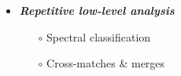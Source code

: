 \begin{frame}
\begin{columns}[T]
\begin{column}{.6\textwidth}
\begin{overlayarea}{\textwidth}{\textheight}
\begin{onlyenv}
\begin{itemize}[<.->]
            \vspace{0.5em}
            \item \emph{\bf Repetitive low-level analysis}
              \begin{itemize}[<.->]
                \item[$\circ$] Spectral classification
                \item[$\circ$] Cross-matches \& merges
              \end{itemize}

          \end{itemize}
        \end{onlyenv}
      \end{overlayarea}
    \end{column}
  
  \end{columns}

\end{frame}



